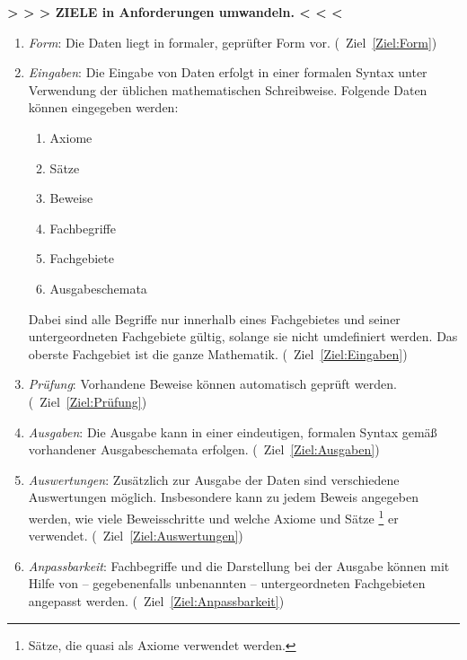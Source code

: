 \documentclass[english,ngerman,parskip=half,headsepline,footsepline]{scrreprt}
\begin{document}
	\textbf{> > > ZIELE in Anforderungen umwandeln. < < <}%
	\begin{enumerate}

		\item \label{Anforderung:Form} \emph{Form}: Die Daten liegt in formaler, geprüfter Form vor.
		(\seename\ Ziel~\vref{Ziel:Form})

		\item \label{Anforderung:Eingaben} \emph{Eingaben}: Die Eingabe von Daten erfolgt in einer formalen Syntax unter Verwendung der üblichen mathematischen Schreibweise.
		Folgende Daten können eingegeben werden:
		\begin{enumerate}
			\item Axiome
			\item Sätze
			\item Beweise
			\item Fachbegriffe
			\item Fachgebiete
			\item Ausgabeschemata
		\end{enumerate}
		Dabei sind alle Begriffe nur innerhalb eines Fachgebietes und seiner untergeordneten Fachgebiete gültig, solange sie nicht umdefiniert werden.
	Das oberste Fachgebiet ist die ganze Mathematik.
	(\seename\ Ziel~\vref{Ziel:Eingaben})

		\item \label{Anforderung:Prüfung} \emph{Prüfung}: Vorhandene Beweise können automatisch geprüft werden.
		(\seename\ Ziel~\vref{Ziel:Prüfung})

		\item \label{Anforderung:Ausgaben} \emph{Ausgaben}: Die Ausgabe kann in einer eindeutigen, formalen Syntax gemäß vorhandener Ausgabeschemata erfolgen.
		(\seename\ Ziel~\vref{Ziel:Ausgaben})

		\item \label{Anforderung:Auswertungen} \emph{Auswertungen}: Zusätzlich zur Ausgabe der Daten sind verschiedene Auswertungen möglich.
		Insbesondere kann zu jedem Beweis angegeben werden, wie viele Beweisschritte und welche Axiome und Sätze%
		\footnote{Sätze, die quasi als Axiome verwendet werden.}
		er verwendet.
		(\seename\ Ziel~\vref{Ziel:Auswertungen})

		\item \label{Anforderung:Anpassbarkeit} \emph{Anpassbarkeit}: Fachbegriffe und die Darstellung bei der Ausgabe können mit Hilfe von -- gegebenenfalls unbenannten -- untergeordneten Fachgebieten angepasst werden.
		(\seename\ Ziel~\vref{Ziel:Anpassbarkeit})


\end{enumerate}
\end{document}
